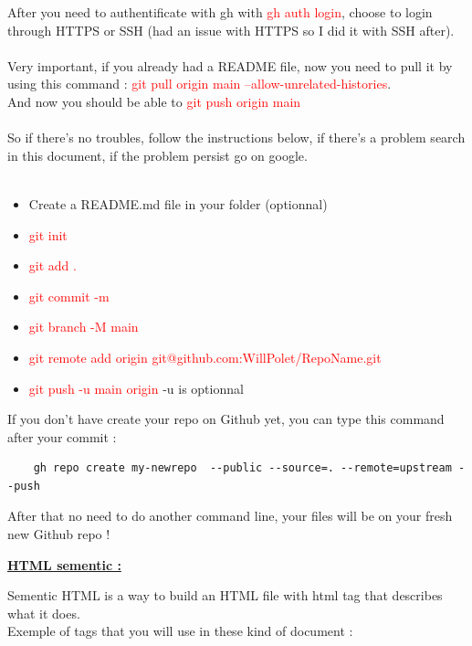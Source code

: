 \documentclass{article}
\begin{document}
After you need to authentificate with gh with \textcolor{red}{gh auth login}, choose to login through HTTPS or SSH (had an issue with HTTPS so I did it with SSH after). \\ \\
Very important, if you already had a README file, now you need to pull it by using this command : \textcolor{red}{git pull origin main --allow-unrelated-histories}. \\
And now you should be able to \textcolor{red}{git push origin main} \\ \\
So if there's no troubles, follow the instructions below, if there's a problem search in this document, if the problem persist go on google. \\ \\
\begin{itemize}
    \item Create a README.md file in your folder (optionnal)
    \item \textcolor{red}{git init}
    \item \textcolor{red}{git add .}
    \item \textcolor{red}{git commit -m}
    \item \textcolor{red}{git branch -M main}
    \item \textcolor{red}{git remote add origin git@github.com:WillPolet/RepoName.git}
    \item \textcolor{red}{git push -u main origin} -u is optionnal
\end{itemize}
\vspace{0.3cm}
If you don't have create your repo on Github yet, you can type this command after your commit : \\
{
\color{red}%
\begin{verbatim}
    gh repo create my-newrepo  --public --source=. --remote=upstream --push
\end{verbatim}
}
\noindent After that no need to do another command line, your files will be on your fresh new Github repo !
\newpage
\begin{center}
    \LARGE{\bf \underline {HTML sementic :}} \\
\end{center}
Sementic HTML is a way to build an HTML file with html tag that describes what it does. \\
Exemple of tags that you will use in these kind of document : \\ \\
\end{document}
